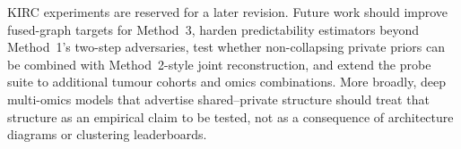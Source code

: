 KIRC experiments are reserved for a later revision. Future work should improve fused-graph targets for Method~3, harden predictability estimators beyond Method~1's two-step adversaries, test whether non-collapsing private priors can be combined with Method~2-style joint reconstruction, and extend the probe suite to additional tumour cohorts and omics combinations. More broadly, deep multi-omics models that advertise shared--private structure should treat that structure as an empirical claim to be tested, not as a consequence of architecture diagrams or clustering leaderboards.
